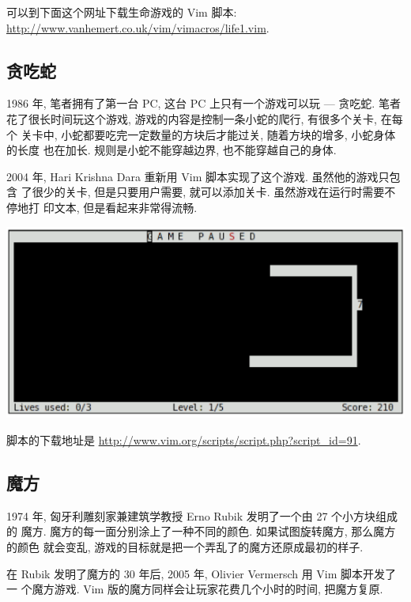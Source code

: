 可以到下面这个网址下载生命游戏的 Vim 脚本:
\url{http://www.vanhemert.co.uk/vim/vimacros/life1.vim}.

\subsection{贪吃蛇}
\label{subsec:nibbles}

1986 年, 笔者拥有了第一台 PC, 这台 PC 上只有一个游戏可以玩 --- 贪吃蛇. 笔者
花了很长时间玩这个游戏, 游戏的内容是控制一条小蛇的爬行, 有很多个关卡, 在每个
关卡中, 小蛇都要吃完一定数量的方块后才能过关, 随着方块的增多, 小蛇身体的长度
也在加长. 规则是小蛇不能穿越边界, 也不能穿越自己的身体.

2004 年, Hari Krishna Dara 重新用 Vim 脚本实现了这个游戏. 虽然他的游戏只包含
了很少的关卡, 但是只要用户需要, 就可以添加关卡. 虽然游戏在运行时需要不停地打
印文本, 但是看起来非常得流畅.

\begin{center}
    \includegraphics[scale=0.7]{./images/page203-1.png}
\end{center}

脚本的下载地址是 \url{http://www.vim.org/scripts/script.php?script_id=91}.

\subsection{魔方}
\label{subsec:rubik_s_cube}

1974 年, 匈牙利雕刻家兼建筑学教授 Erno Rubik 发明了一个由 27 个小方块组成的
魔方. 魔方的每一面分别涂上了一种不同的颜色. 如果试图旋转魔方, 那么魔方的颜色
就会变乱, 游戏的目标就是把一个弄乱了的魔方还原成最初的样子.

在 Rubik 发明了魔方的 30 年后, 2005 年, Olivier Vermersch 用 Vim 脚本开发了一
个魔方游戏. Vim 版的魔方同样会让玩家花费几个小时的时间, 把魔方复原.

